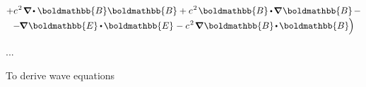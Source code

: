 \begin{multline*}
+ c^{\hspace{.16ex}2} \hspace{.22ex} \boldnabla \hspace{-0.15ex} \dotp \boldmathbb{B} \boldmathbb{B}
+ c^{\hspace{.16ex}2} \hspace{.22ex} \boldmathbb{B} \hspace{-0.1ex} \dotp \hspace{-0.22ex} \boldnabla \hspace{.2ex} \boldmathbb{B} \Bigr. \hspace{.3ex} -
\\[-0.55em]
%
- \hspace{-0.2ex} \Bigl. \boldnabla \hspace{.2ex} \boldmathbb{E} \hspace{-0.1ex} \dotp \hspace{-0.15ex} \boldmathbb{E} \hspace{.1ex}
- c^{\hspace{.16ex}2} \hspace{.22ex} \boldnabla \hspace{.2ex} \boldmathbb{B} \hspace{-0.2ex} \dotp \hspace{-0.16ex} \boldmathbb{B} \hspace{-0.1ex}
\Bigr)
\end{multline*}

...



To derive wave equations

